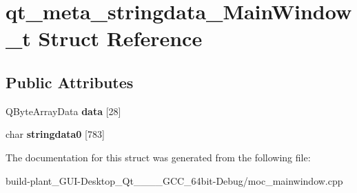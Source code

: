 \hypertarget{structqt__meta__stringdata__MainWindow__t}{}\section{qt\+\_\+meta\+\_\+stringdata\+\_\+\+Main\+Window\+\_\+t Struct Reference}
\label{structqt__meta__stringdata__MainWindow__t}
\subsection*{Public Attributes}
\begin{DoxyCompactItemize}
\item 
\mbox{\label{structqt__meta__stringdata__MainWindow__t_a9c03f3d8180b5ac4f42de4a9d5710921}} 
Q\+Byte\+Array\+Data {\bfseries data} \mbox{[}28\mbox{]}
\item 
\mbox{\label{structqt__meta__stringdata__MainWindow__t_aa8fe1218b877554c21462fac5fb1a850}} 
char {\bfseries stringdata0} \mbox{[}783\mbox{]}
\end{DoxyCompactItemize}


The documentation for this struct was generated from the following file\+:\begin{DoxyCompactItemize}
\item 
build-\/plant\+\_\+\+G\+U\+I-\/\+Desktop\+\_\+\+Qt\+\_\+\_\+\_\+\_\+\+G\+C\+C\+\_\+64bit-\/\+Debug/moc\+\_\+mainwindow.\+cpp\end{DoxyCompactItemize}
